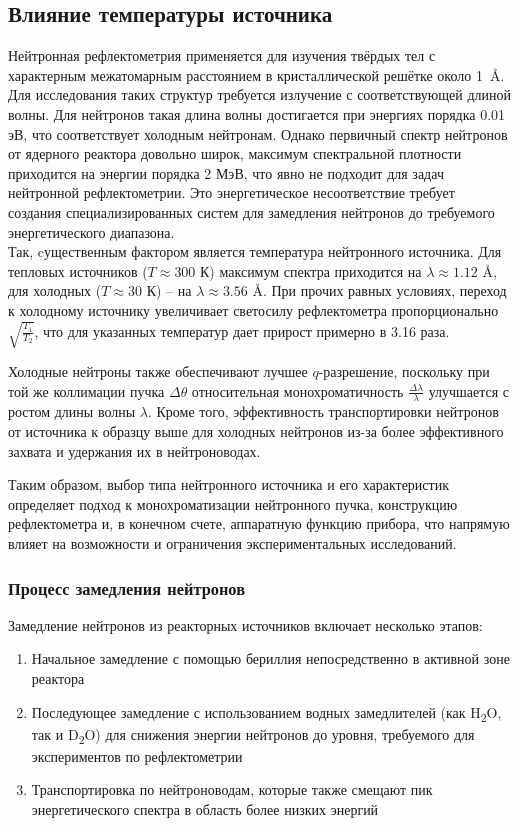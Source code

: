 \documentclass[a4paper]{article}
\begin{document}
\subsection*{Влияние температуры источника}
Нейтронная рефлектометрия применяется для изучения твёрдых тел с характерным межатомарным расстоянием в кристаллической решётке около \SI{1}{\angstrom}. Для исследования таких структур требуется излучение с соответствующей длиной волны. Для нейтронов такая длина волны достигается при энергиях порядка 0.01 эВ, что соответствует холодным нейтронам. Однако первичный спектр нейтронов от ядерного реактора довольно широк, максимум спектральной плотности приходится на энергии порядка 2 МэВ, что явно не подходит для задач нейтронной рефлектометрии. Это энергетическое несоответствие требует создания специализированных систем для замедления нейтронов до требуемого энергетического диапазона.\\
Так, cущественным фактором является температура нейтронного источника. Для тепловых источников ($T \approx 300$ К) максимум спектра приходится на $\lambda \approx 1.12$ \AA, для холодных ($T \approx 30$ К) -- на $\lambda \approx 3.56$ \AA. При прочих равных условиях, переход к холодному источнику увеличивает светосилу рефлектометра пропорционально $\sqrt{\frac{T_1}{T_2}}$, что для указанных температур дает прирост примерно в 3.16 раза.

Холодные нейтроны также обеспечивают лучшее $q$-разрешение, поскольку при той же коллимации пучка $\Delta\theta$ относительная монохроматичность $\frac{\Delta\lambda}{\lambda}$ улучшается с ростом длины волны $\lambda$. Кроме того, эффективность транспортировки нейтронов от источника к образцу выше для холодных нейтронов из-за более эффективного захвата и удержания их в нейтроноводах. \cite{15}

Таким образом, выбор типа нейтронного источника и его характеристик определяет подход к монохроматизации нейтронного пучка, конструкцию рефлектометра и, в конечном счете, аппаратную функцию прибора, что напрямую влияет на возможности и ограничения экспериментальных исследований.

\subsubsection*{Процесс замедления нейтронов}

Замедление нейтронов из реакторных источников включает несколько этапов:

\begin{enumerate}
    \item Начальное замедление с помощью бериллия непосредственно в активной зоне реактора    
    \item Последующее замедление с использованием водных замедлителей (как H\textsubscript{2}O, так и D\textsubscript{2}O) для снижения энергии нейтронов до уровня, требуемого для экспериментов по рефлектометрии     
    \item Транспортировка по нейтроноводам, которые также смещают пик энергетического спектра в область более низких энергий \end{enumerate}
\end{document}
